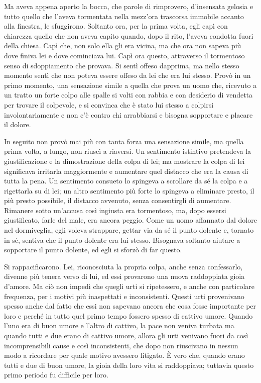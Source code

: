 Ma aveva appena aperto la bocca, che parole di rimprovero, d'insensata gelosia e tutto quello che l'aveva tormentata nella mezz'ora trascorsa immobile accanto alla finestra, le sfuggirono. Soltanto ora, per la prima volta, egli capì con chiarezza quello che non aveva capito quando, dopo il rito, l'aveva condotta fuori della chiesa. Capì che, non solo ella gli era vicina, ma che ora non sapeva più dove finiva lei e dove cominciava lui. Capì ora questo, attraverso il tormentoso senso di sdoppiamento che provava. Si sentì offeso dapprima, ma nello stesso momento sentì che non poteva essere offeso da lei che era lui stesso. Provò in un primo momento, una sensazione simile a quella che prova un uomo che, ricevuto a un tratto un forte colpo alle spalle si volti con rabbia e con desiderio di vendetta per trovare il colpevole, e si convinca che è stato lui stesso a colpirsi involontariamente e non c'è contro chi arrabbiarsi e bisogna sopportare e placare il dolore. 

In seguito non provò mai più con tanta forza una sensazione simile, ma quella prima volta, a lungo, non riuscì a riaversi. Un sentimento istintivo pretendeva la giustificazione e la dimostrazione della colpa di lei; ma mostrare la colpa di lei significava irritarla maggiormente e aumentare quel distacco che era la causa di tutta la pena. Un sentimento consueto lo spingeva a scrollare da sé la colpa e a rigettarla su di lei; un altro sentimento più forte lo spingeva a eliminare presto, il più presto possibile, il distacco avvenuto, senza consentirgli di aumentare. Rimanere sotto un'accusa così ingiusta era tormentoso, ma, dopo essersi giustificato, farle del male, era ancora peggio. Come un uomo affannato dal dolore nel dormiveglia, egli voleva strappare, gettar via da sé il punto dolente e, tornato in sé, sentiva che il punto dolente era lui stesso. Bisognava soltanto aiutare a sopportare il punto dolente, ed egli si sforzò di far questo. 

Si rappacificarono. Lei, riconosciuta la propria colpa, anche senza confessarlo, divenne più tenera verso di lui, ed essi provarono una nuova raddoppiata gioia d'amore. Ma ciò non impedì che quegli urti si ripetessero, e anche con particolare frequenza, per i motivi più inaspettati e inconsistenti. Questi urti provenivano spesso anche dal fatto che essi non sapevano ancora che cosa fosse importante per loro e perché in tutto quel primo tempo fossero spesso di cattivo umore. Quando l'uno era di buon umore e l'altro di cattivo, la pace non veniva turbata ma quando tutti e due erano di cattivo umore, allora gli urti venivano fuori da così incomprensibili cause e così inconsistenti, che dopo non riuscivano in nessun modo a ricordare per quale motivo avessero litigato. È vero che, quando erano tutti e due di buon umore, la gioia della loro vita si raddoppiava; tuttavia questo primo periodo fu difficile per loro. 

